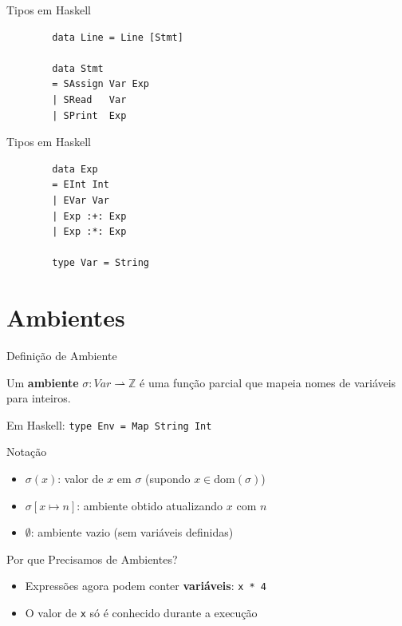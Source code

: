 \begin{frame}[fragile]{Tipos em Haskell}

    \begin{lstlisting}
        data Line = Line [Stmt]

        data Stmt
        = SAssign Var Exp
        | SRead   Var
        | SPrint  Exp
    \end{lstlisting}
\end{frame}

\begin{frame}[fragile]{Tipos em Haskell}

    \begin{lstlisting}
        data Exp
        = EInt Int
        | EVar Var
        | Exp :+: Exp
        | Exp :*: Exp

        type Var = String
    \end{lstlisting}
\end{frame}


\section{Ambientes}\label{ambientes}

\begin{frame}[fragile]{Definição de Ambiente}

    Um \textbf{ambiente}
    \(\sigma : \mathit{Var} \rightharpoonup \mathbb{Z}\) é uma função
    parcial que mapeia nomes de variáveis para inteiros.

    Em Haskell: \texttt{type Env = Map String Int}
\end{frame}

\begin{frame}{Notação}

    \begin{itemize}

        \item
        \(\sigma(x)\): valor de \(x\) em \(\sigma\) (supondo
        \(x \in \mathrm{dom}(\sigma)\))
        \item
        \(\sigma[x \mapsto n]\): ambiente obtido atualizando \(x\) com \(n\)
        \item
        \(\emptyset\): ambiente vazio (sem variáveis definidas)
    \end{itemize}
\end{frame}

\begin{frame}[fragile]{Por que Precisamos de Ambientes?}

    \begin{itemize}

        \item
        Expressões agora podem conter \textbf{variáveis}:
        \texttt{x * 4}
        \item
        O valor de \texttt{x} só é conhecido durante a
        execução
    \end{itemize}
\end{frame}

